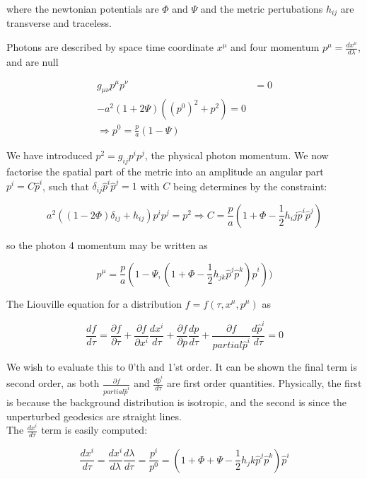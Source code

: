 \documentclass[a4paper,11pt]{article}
\newcommand{\half}{\frac{1}{2}}
\begin{document}
where the newtonian potentials are $\Phi$ and $\Psi$ and the metric pertubations $h_{ij}$ are transverse and traceless. 


Photons are described by space time coordinate $x^\mu$ and four momentum $p^\mu=\frac{dx^\mu}{d\lambda}$, and are null

\begin{align}
g_{\mu\nu}p^\mu p^\nu&=0\\
-a^2(1+2\Psi)((p^0)^2 + p^2) = 0\\
\Rightarrow p^0 = \frac{p}{a}(1-\Psi)
\end{align}

We have introduced $p^2=g_{ij}p^ip^j$, the physical photon momentum. We now factorise the spatial part of the metric into an amplitude an angular part $p^i = C\hat{p}^i$, such that $\delta_{ij}\hat{p}^i\hat{p}^j=1$ with $C$ being determines by the constraint:

\begin{equation}
a^2((1-2\Phi)\delta_{ij}+h_{ij})p^ip^j = p^2 \Rightarrow C=\frac{p}{a}(1+\Phi-\half h_ij\hat{p}^i\hat{p}^j)
\end{equation}

so the photon 4 momentum may be written as 

\begin{equation}
p^\mu = \frac{p}{a}(1-\Psi, (1+\Phi-\half h_{jk}\hat{p}^j\hat{p}^k)\hat{p}^i))
\end{equation}

The Liouville equation for a distribution $f=f(\tau, x^\mu, p^\mu)$ as

\begin{equation}
\frac{df}{d\tau} = \frac{\partial f}{\partial\tau} + \frac{\partial f}{\partial x^i} \frac{dx^i}{d\tau} + \frac{\partial f}{\partial p} \frac{dp}{d\tau} + \frac{\partial f}{partial\hat{p}^i} \frac{d\hat{p}^i}{d\tau}  = 0
\label{Liouville}
\end{equation}

We wish to evaluate this to 0'th and 1'st order. It can be shown the final term is second order, as both $\frac{\partial f}{partial\hat{p}^i}$ and  $\frac{d\hat{p}^i}{d\tau}$ are first order quantities. Physically, the first is because the background distribution is isotropic, and the second is since the unperturbed geodesics are straight lines. \\

The $\frac{dx^i}{d\tau}$ term is easily computed:

\begin{equation}
\frac{dx^i}{d\tau} = \frac{dx^i}{d\lambda}\frac{d\lambda}{d\tau} = \frac{p^i}{p^0} = (1+\Phi+\Psi-\half h_jk\hat{p}^j\hat{p}^k)\hat{p}^i
\end{equation}
\end{document}
